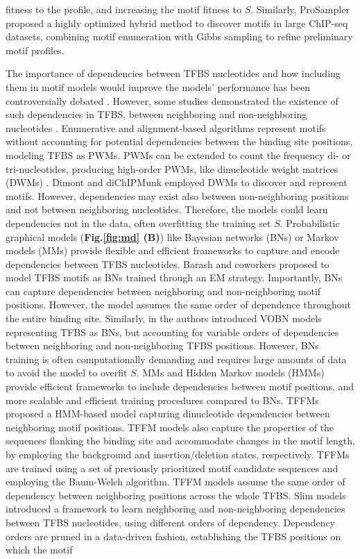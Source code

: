 \documentclass[a4paper, titlepage, 8pt, openright]{book}
\begin{document}
fitness to the profile, and increasing the motif fitness to $S$. Similarly, ProSampler \citep{li2019prosampler} proposed a highly optimized hybrid method to discover motifs in large ChIP-seq datasets, combining motif enumeration with Gibbs sampling to refine preliminary motif profiles.

The importance of dependencies between TFBS nucleotides and how including them in motif models would improve the models’ performance has been controversially debated \citep{tomovic2007position,morris2011jury,zhao2011quantitative}. However, some studies demonstrated the existence of such dependencies in TFBS, between neighboring and non-neighboring nucleotides \citep{slattery2014absence,rohs2010origins}. Enumerative and alignment-based algorithms represent motifs without accounting for potential dependencies between the binding site positions, modeling TFBS as PWMs. PWMs can be extended to count the frequency di- or tri-nucleotides, producing high-order PWMs, like dinucleotide weight matrices (DWMs) \citep{siddharthan2010dinucleotide}. Dimont \citep{grau2013general} and diChIPMunk \citep{kulakovskiy2013binding} employed DWMs to discover and represent motifs. However, dependencies may exist also between non-neighboring positions and not between neighboring nucleotides. Therefore, the models could learn dependencies not in the data, often overfitting the training set $S$. Probabilistic graphical models (\textbf{Fig.\ref{fig:md} (B)}) like Bayesian networks (BNs) or Markov models (MMs) provide flexible and efficient frameworks to capture and encode dependencies between TFBS nucleotides. Barash and coworkers \citep{barash2003modeling} proposed to model TFBS motifs as BNs trained through an EM strategy. Importantly, BNs can capture dependencies between neighboring and non-neighboring motif positions. However, the model assumes the same order of dependence throughout the entire binding site. Similarly, in \citep{ben2005identification} the authors introduced VOBN models representing TFBS as BNs, but accounting for variable orders of dependencies between neighboring and non-neighboring TFBS positions. However, BNs training is often computationally demanding and requires large amounts of data to avoid the model to overfit $S$. MMs and Hidden Markov models (HMMs) provide efficient frameworks to include dependencies between motif positions, and more scalable and efficient training procedures compared to BNs. TFFMs \citep{mathelier2013next} proposed a HMM-based model capturing dinucleotide dependencies between neighboring motif positions. TFFM models also capture the properties of the sequences flanking the binding site and accommodate changes in the motif length, by employing the background and insertion/deletion states, respectively. TFFMs are trained using a set of previously prioritized motif candidate sequences and employing the Baum-Welch algorithm. TFFM models assume the same order of dependency between neighboring positions across the whole TFBS. Slim models \citep{keilwagen2015varying} introduced a framework to learn neighboring and non-neighboring dependencies between TFBS nucleotides, using different orders of dependency. Dependency orders are pruned in a data-driven fashion, establishing the TFBS positions on which the motif 
\end{document}
